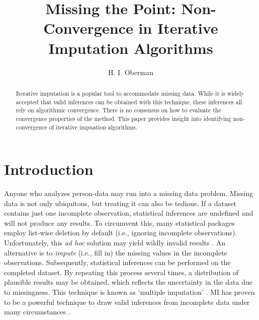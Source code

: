 \documentclass[Royal,times,sageh]{sagej}
\begin{document}
\title{Missing the Point: Non-Convergence in Iterative Imputation Algorithms}


\author{H. I. Oberman}




\begin{abstract}
Iterative imputation is a popular tool to accommodate missing data.
While it is widely accepted that valid inferences can be obtained with
this technique, these inferences all rely on algorithmic convergence.
There is no consensus on how to evaluate the convergence properties of
the method. This paper provides insight into identifying non-convergence
of iterative impuation algorithms.
\end{abstract}


\maketitle

\hypertarget{introduction}{%
\section{Introduction}\label{introduction}}

Anyone who analyzes person-data may run into a missing data problem.
Missing data is not only ubiquitous, but treating it can also be
tedious. If a dataset contains just one incomplete observation,
statistical inferences are undefined and will not produce any results.
To circumvent this, many statistical packages employ list-wise deletion
by default (i.e., ignoring incomplete observations). Unfortunately, this
\emph{ad hoc} solution may yield wildly invalid results \citep{buur18}.
An alternative is to \emph{impute} (i.e., fill in) the missing values in
the incomplete observations. Subsequently, statistical inferences can be
performed on the completed dataset. By repeating this process several
times, a distribution of plausible results may be obtained, which
reflects the uncertainty in the data due to missingness. This technique
is known as `multiple imputation' \citep[MI;][]{rubin76}. MI has proven
to be a powerful technique to draw valid inferences from incomplete data
under many circumstances \citep{buur18}.
\end{document}
